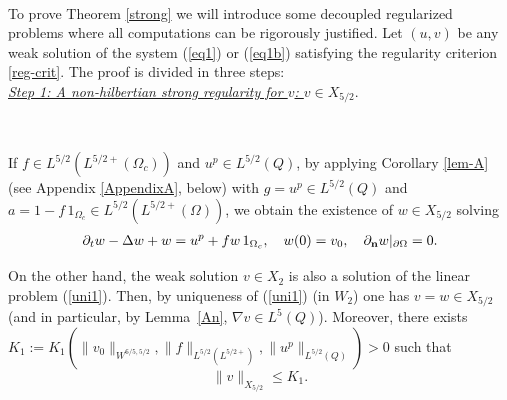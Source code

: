 \documentclass[11pt,reqno]{amsart}%
\numberwithin{equation}{section}
\begin{document}
{\

 
To prove Theorem \ref{strong} 
 we will  introduce some decoupled regularized problems 
 where all computations can be rigorously justified. Let $(u,v)$ be any weak solution of the system   (\ref{eq1}) or (\ref{eq1b}) satisfying the regularity  criterion \eqref{reg-crit}. 
The proof is divided in three steps:\\

 {\it \underline{Step 1: A non-hilbertian strong regularity for $v$: $v\in X_{5/2}$}}. 
 
 \
 
  If  $f\in L^{5/2}(L^{5/2+}(\Omega_c))$  and $u^p\in L^{5/2}(Q)$, %
by applying Corollary \ref{lem-A} (see Appendix \ref{AppendixA}, below) with $g=u^p\in L^{5/2}(Q)$ and $a=1-f\, 1_{\Omega_c}\in L^{5/2}(L^{5/2+}(\Omega)) $, we obtain the existence of $w\in X_{5/2}$  solving
\begin{eqnarray}\label{uni1}
\partial_tw-\Delta w+w=u^p+fw\, 1_{\Omega_c},\quad w(0)=v_0,
\quad \partial_{\bf n} w |_{\partial\Omega}=0.
\end{eqnarray}

On the other hand, the weak solution $v\in X_2$ is also a solution of the linear problem (\ref{uni1}). Then, by uniqueness of (\ref{uni1}) (in $W_2$)
one has   $v=w\in X_{5/2}$ (and in particular, by Lemma~\ref{An}, $\nabla v \in L^5(Q)$). Moreover, there exists %
$
K_1:=K_1(\|v_0\|_{W^{6/5,5/2}},\|f\|_{L^{5/2}(L^{5/2+})}, \|u ^p\|_{L^{5/2}(Q)})>0
$ such that
\begin{equation}\label{xx-1}
\|v\|_{X_{5/2}}\le K_1.
\end{equation}



}
\end{document}
